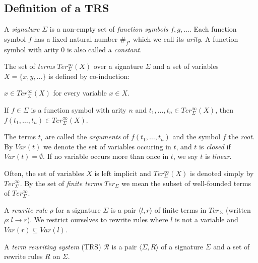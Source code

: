 \subsection{Definition of a TRS}\label{sub:trs}

\begin{definition}[Signature]
A \emph{signature} $\Sigma$ is a non-empty set of \emph{function symbols} $f,
g, \ldots$. Each function symbol $f$ has a fixed natural number $\#_f$, which
we call its \emph{arity}. A function symbol with arity $0$ is also called a
\emph{constant}.
\end{definition}

\begin{definition}[Term]
The set of \emph{terms} $Ter_\Sigma^\infty(X)$ over a signature $\Sigma$ and a
set of variables $X = \{x, y, \ldots\}$ is defined by co-induction:
\begin{compactenum}
  \item
    $x \in Ter_\Sigma^\infty(X)$ for every variable $x \in X$.
  \item
    If $f \in \Sigma$ is a function symbol with arity $n$ and $t_1, \ldots,
    t_n \in Ter_\Sigma^\infty(X)$, then $f(t_1, \ldots, t_n) \in
    Ter_\Sigma^\infty(X)$.
\end{compactenum}
\end{definition}

The terms $t_i$ are called the \emph{arguments} of $f(t_1, \ldots, t_n)$ and
the symbol $f$ the \emph{root}. By $Var(t)$ we denote the set of variables
occuring in $t$, and $t$ is \emph{closed} if $Var(t) = \emptyset$. If no
variable occurs more than once in $t$, we say $t$ is \emph{linear}.

Often, the set of variables $X$ is left implicit and $Ter_\Sigma^\infty(X)$ is
denoted simply by $Ter_\Sigma^\infty$. By the set of \emph{finite terms}
$Ter_\Sigma$ we mean the subset of well-founded terms of $Ter_\Sigma^\infty$.

\begin{definition}
  A \emph{rewrite rule} $\rho$ for a signature $\Sigma$ is a pair $\langle l,
  r \rangle$ of finite terms in $Ter_\Sigma$ (written $\rho : l \rightarrow
  r$). We restrict ourselves to rewrite rules where $l$ is not a variable and
  $Var(r) \subseteq Var(l)$.
\end{definition}

\begin{definition}[TRS]
A \emph{term rewriting system} (TRS) $\mathcal{R}$ is a pair $\langle \Sigma,
R \rangle$ of a signature $\Sigma$ and a set of rewrite rules $R$ on
$\Sigma$.
\end{definition}

